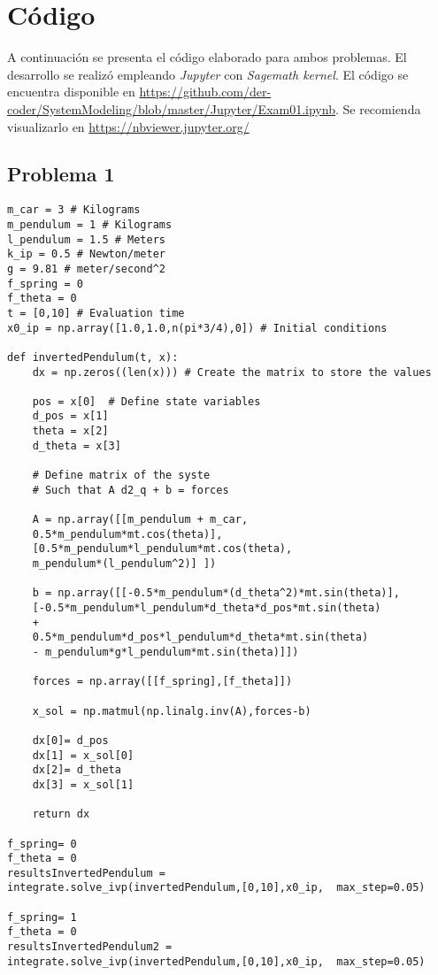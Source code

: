 \documentclass[12pt,letterpaper]{article}
\begin{document}
\section{Código}

A continuación se presenta el código elaborado para ambos problemas. El desarrollo se realizó empleando \emph{Jupyter} con \emph{Sagemath kernel}. El código se encuentra disponible en \url{https://github.com/der-coder/SystemModeling/blob/master/Jupyter/Exam01.ipynb}. Se recomienda visualizarlo en \url{https://nbviewer.jupyter.org/}

\subsection{Problema 1}

\begin{verbatim}
m_car = 3 # Kilograms
m_pendulum = 1 # Kilograms
l_pendulum = 1.5 # Meters
k_ip = 0.5 # Newton/meter
g = 9.81 # meter/second^2
f_spring = 0 
f_theta = 0 
t = [0,10] # Evaluation time
x0_ip = np.array([1.0,1.0,n(pi*3/4),0]) # Initial conditions

def invertedPendulum(t, x):
    dx = np.zeros((len(x))) # Create the matrix to store the values
        
    pos = x[0]  # Define state variables
    d_pos = x[1]
    theta = x[2]
    d_theta = x[3]

    # Define matrix of the syste
    # Such that A d2_q + b = forces
    
    A = np.array([[m_pendulum + m_car,
    0.5*m_pendulum*mt.cos(theta)],
    [0.5*m_pendulum*l_pendulum*mt.cos(theta),
    m_pendulum*(l_pendulum^2)] ])

    b = np.array([[-0.5*m_pendulum*(d_theta^2)*mt.sin(theta)],
    [-0.5*m_pendulum*l_pendulum*d_theta*d_pos*mt.sin(theta)
    +       
    0.5*m_pendulum*d_pos*l_pendulum*d_theta*mt.sin(theta)
    - m_pendulum*g*l_pendulum*mt.sin(theta)]])
    
    forces = np.array([[f_spring],[f_theta]])
    
    x_sol = np.matmul(np.linalg.inv(A),forces-b)
    
    dx[0]= d_pos
    dx[1] = x_sol[0]
    dx[2]= d_theta
    dx[3] = x_sol[1]
    
    return dx
    
f_spring= 0
f_theta = 0
resultsInvertedPendulum =
integrate.solve_ivp(invertedPendulum,[0,10],x0_ip,  max_step=0.05)

f_spring= 1
f_theta = 0
resultsInvertedPendulum2 =
integrate.solve_ivp(invertedPendulum,[0,10],x0_ip,  max_step=0.05)


\end{verbatim}
\end{document}
